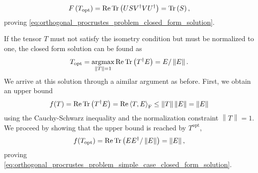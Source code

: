 \begin{equation}
	F\left(T_\text{opt}\right) = \operatorname{Re}\operatorname{Tr}\left(USV^\dagger VU^\dagger\right) = \operatorname{Tr}\left(S\right),
\end{equation}
proving \eqref{eq:orthogonal_procrustes_problem_closed_form_solution}. \par
If the tensor $T$ must not satisfy the isometry condition but must be normalized to one, the closed form solution can be found as
\begin{equation}
	\label{eq:orthogonal_procrustes_problem_simple_case_closed_form_solution}
	T_\text{opt} = \underset{\left\lVert T\right\rVert = 1}{\operatorname{argmax}} \operatorname{Re}\operatorname{Tr}\left(T^\dagger E\right) = E/\left\lVert E\right\rVert.
\end{equation}
We arrive at this solution through a aimilar argument as before. First, we obtain an upper bound
\begin{equation}
	f(T) = \operatorname{Re}\operatorname{Tr}\left(T^\dagger E\right) = \operatorname{Re}\left\langle T, E\right\rangle_\text{F} \le \left\lVert T\right\rVert\left\lVert E\right\rVert = \left\lVert E\right\rVert
\end{equation}
using the Cauchy-Schwarz inequality and the normalization constraint $\left\lVert T\right\rVert = 1$. We proceed by showing that the upper bound is reached by $T^\text{opt}$,
\begin{equation}
	f(T_\text{opt}) = \operatorname{Re}\operatorname{Tr}\left(EE^\dagger/\left\lVert E\right\rVert\right) = \left\lVert E \right\rVert,
\end{equation}
proving \eqref{eq:orthogonal_procrustes_problem_simple_case_closed_form_solution}.